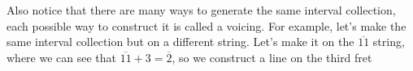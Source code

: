 \documentclass[preview]{standalone}
\begin{document}
\begin{center}
Also notice that there are many ways to generate the same interval collection, each possible way to construct it is called a voicing. For example, let's make the same interval collection but on a different string. Let's make it on the $\overline{11}$ string, where we can see that $\overline{11} + 3 = \overline{2}$, so we construct a line on the third fret
\end{center}
\end{document}
